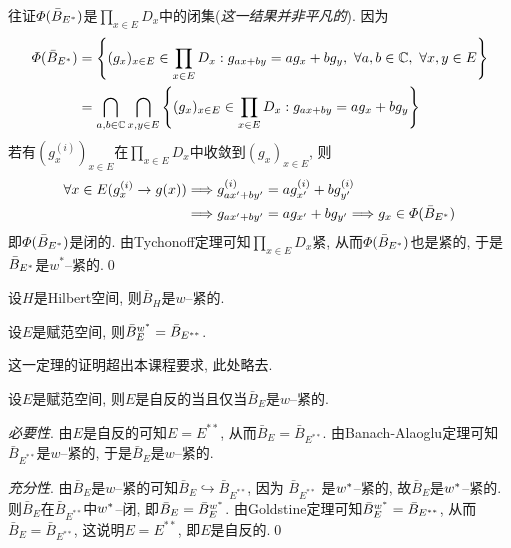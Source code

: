 \begin{Proof}
	往证$ \varPhi(\bar{B}_{E^{*}}) $是$ \prod\limits_{x\in E}D_x $中的闭集(\textsl{这一结果并非平凡的}). 因为
	\[
		\begin{aligned}
			\varPhi(\bar{B}_{\Star{E}}) & =\left\{ (g_x)_{x\in E}\in\prod_{x\in E}D_x : g_{ax+by}=ag_x+bg_y,\ \forall a,b\in\C,\ \forall x,y\in E \right\} \\
			                            & =\bigcap_{a,b\in\C}\bigcap_{x,y\in E}\left\{ (g_x)_{x\in E}\in\prod_{x\in E}D_x : g_{ax+by}=ag_x+bg_y \right\}
		\end{aligned}
	\]
	若有$ (g_x^{(i)})_{x\in E} $在$ \prod\limits_{x\in E}D_x $中收敛到$ (g_x)_{x\in E} $, 则
	\[
		\begin{aligned}
			\forall x\in E(g_x^{(i)}\to g(x)) & \Longrightarrow g_{ax'+by'}^{(i)}=ag_{x'}^{(i)}+bg_{y'}^{(i)}                                \\
			                                  & \Longrightarrow g_{ax'+by'}=ag_{x'}+bg_{y'}\Longrightarrow g_x\in\varPhi(\bar{B}_{E^{*}})
		\end{aligned}
	\]
	即$ \varPhi(\bar{B}_{E^{*}}) $是闭的. 由Tychonoff定理可知$ \prod\limits_{x\in E}D_x $紧, 从而$ \varPhi(\bar{B}_{E^{*}}) $也是紧的, 于是$ \bar{B}_{E^{*}} $是$ w^* $--紧的.\qed
\end{Proof}

\begin{Corollary}
	设$ H $是Hilbert空间, 则$ \bar{B}_H $是$ w $--紧的.
\end{Corollary}

\begin{Theorem}[Goldstine]
	设$ E $是赋范空间, 则$ \bar{B}_E^{w^{*}}=\bar{B}_{E^{**}} $.
\end{Theorem}

这一定理的证明超出本课程要求, 此处略去.

\begin{Corollary}[Banach]
	设$ E $是赋范空间, 则$ E $是自反的当且仅当$ \bar{B}_E $是$ w $--紧的.
\end{Corollary}
\begin{Proof}
	\textsl{必要性}. 由$ E $是自反的可知$ E=E^{**} $, 从而$ \bar{B}_E=\bar{B}_{E^{**}} $. 由Banach-Alaoglu定理可知$ \bar{B}_{E^{**}} $是$ w $--紧的, 于是$ \bar{B}_E $是$ w $--紧的.

	\textsl{充分性}. 由$ \bar{B}_E $是$ w $--紧的可知$ \bar{B}_E\hookrightarrow\bar{B}_{E^{**}} $, 因为 $ \bar{B}_{E^{**}} $ 是$ w^{*} $--紧的, 故$ \bar{B}_E $是$ w^{*} $--紧的. 则$ \bar{B}_E $在$ \bar{B}_{E^{**}} $中$ w^{*} $--闭, 即$ \bar{B}_E=\bar{B}_E^{w^{*}} $. 由Goldstine定理可知$ \bar{B}_E^{w^{*}}=\bar{B}_{E^{**}} $, 从而$ \bar{B}_E=\bar{B}_{E^{**}} $, 这说明$ E=E^{**} $, 即$ E $是自反的.\qed
\end{Proof}

